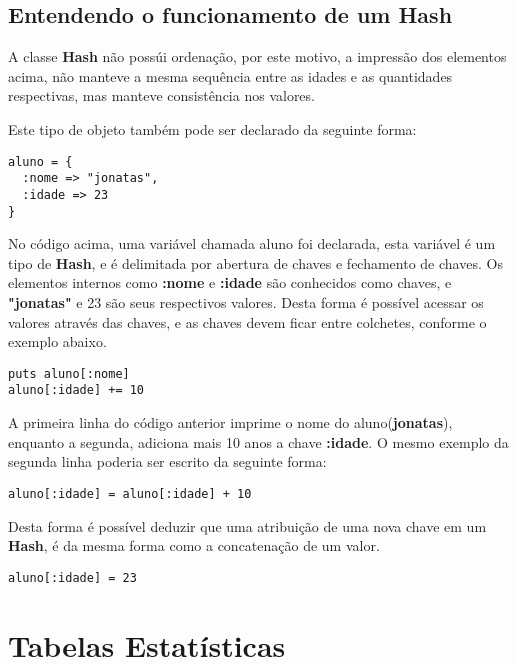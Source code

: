 \documentclass[espaco=simples,appendix=Name]{abnt}
\newcommand{\code}[1] {\textbf{#1}}
\begin{document}
\subsection { Entendendo o funcionamento de um Hash }

A classe \code{Hash} não possúi ordenação, por este motivo, a impressão dos elementos acima, não manteve a mesma sequência entre as idades e as quantidades respectivas, mas manteve consistência nos valores.

Este tipo de objeto também pode ser declarado da seguinte forma:

\begin{lstlisting}[caption=Sintaxe de declaração de um \code{Hash}]
aluno = { 
  :nome => "jonatas",
  :idade => 23
}
\end{lstlisting}

No código acima, uma variável chamada aluno foi declarada, esta variável é um tipo de \code{Hash}, e é delimitada por abertura de chaves e fechamento de chaves. Os elementos internos como \code{:nome} e \code{:idade} são conhecidos como chaves, e \code{"jonatas"} e 23 são seus respectivos valores. Desta forma é possível acessar os valores através das chaves, e as chaves devem ficar entre colchetes, conforme o exemplo abaixo. 


\begin{lstlisting}[caption=Usufruindo dos métodos do \code{Hash}]
puts aluno[:nome] 
aluno[:idade] += 10
\end{lstlisting}

A primeira linha do código anterior imprime o nome do aluno(\code{jonatas}), enquanto a segunda, adiciona mais 10 anos a chave \code{:idade}. O mesmo exemplo da segunda linha poderia ser escrito da seguinte forma:

\begin{lstlisting}[caption=Somando 10 anos a chave :idade]
aluno[:idade] = aluno[:idade] + 10
\end{lstlisting}

Desta forma é possível deduzir que uma atribuição de uma nova chave em um \code{Hash}, é da mesma forma como a concatenação de um valor.

\begin{lstlisting}[caption=Atribuindo o valor 23 para a chave :idade da variável aluno]
aluno[:idade] = 23 
\end{lstlisting}

\section { Tabelas Estatísticas }
\end{document}
